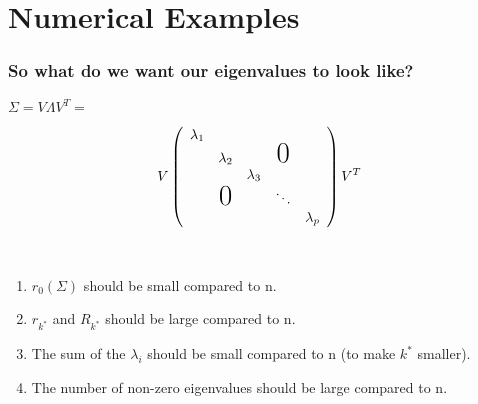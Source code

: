 \documentclass[pdf]{beamer}
\begin{document}
\section{Numerical Examples}

\begin{frame}
\fontsize{8pt}{9pt}
\frametitle{So what do we want our eigenvalues to look like?}

$\Sigma = V \Lambda V^{T} =$

\[
    V \left(
    \begin{array}{ccccc}
    \lambda_{1}                                    \\
      & \lambda_{2}   &   & \text{\huge0}\\
      &               & \lambda_{3}                 \\
      & \text{\huge0} &   & \ddots             \\
      &               &   &   & \lambda_{p} 
    \end{array}
    \right) V^{T}
\]  


\\
\begin{enumerate}
\item<3-6> $r_{0}(\Sigma)$ should be small compared to n.
\item<4-6> $r_{k^{*}}$ and $R_{k^{*}}$ should be large compared to n.
\item<5-6> The sum of the $\lambda_{i}$ should be small compared to n (to make $k^{*}$ smaller).
\item<6-6> The number of non-zero eigenvalues should be large compared to n.
\end{enumerate}

\end{frame}
\end{document}
